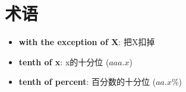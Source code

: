 \chapter{术语}

\begin{multicols}{3}
  \begin{itemize}
    \item \textbf{with the exception of X}: 把X扣掉
    \item \textbf{tenth of x}: x的十分位 ($ aaa.x $)
    \item \textbf{tenth of percent}: 百分数的十分位 ($ aa.x \% $)
  \end{itemize}
\end{multicols}
